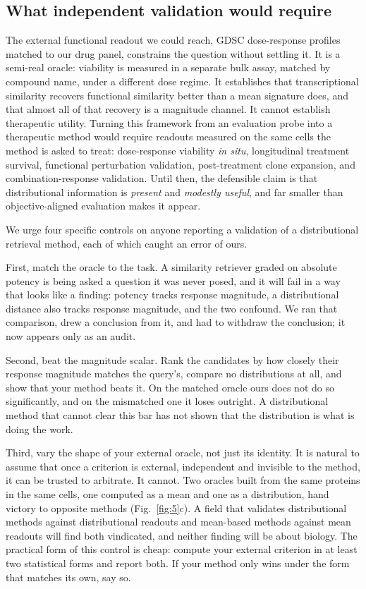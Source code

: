 \documentclass[11pt,letterpaper]{article}
\begin{document}
\subsection*{What independent validation would require}

The external functional readout we could reach, GDSC dose-response profiles matched to our drug
panel, constrains the question without settling it. It is a semi-real oracle: viability is
measured in a separate bulk assay, matched by compound name, under a different dose regime. It
establishes that transcriptional similarity recovers functional similarity better than a mean
signature does, and that almost all of that recovery is a magnitude channel. It cannot establish
therapeutic utility. Turning this framework from an evaluation probe into a therapeutic method would require
readouts measured on the same cells the method is asked to treat: dose-response viability
\emph{in situ}, longitudinal treatment survival, functional perturbation validation,
post-treatment clone expansion, and combination-response validation. Until then, the defensible
claim is that distributional information is \textit{present} and \textit{modestly useful}, and far
smaller than objective-aligned evaluation makes it appear.

We urge four specific controls on anyone reporting a validation of a distributional retrieval
method, each of which caught an error of ours.

First, match the oracle to the task. A similarity retriever graded on absolute potency is
being asked a question it was never posed, and it will fail in a way that looks like a finding:
potency tracks response magnitude, a distributional distance also tracks response magnitude, and
the two confound. We ran that comparison, drew a conclusion from it, and had to withdraw the
conclusion; it now appears only as an audit.

Second, beat the magnitude scalar. Rank the candidates by how closely their response
magnitude matches the query's, compare no distributions at all, and show that your method beats it.
On the matched oracle ours does not do so significantly, and on the mismatched one it loses
outright. A distributional method that cannot clear this bar has not shown that the distribution is
what is doing the work.

Third, vary the shape of your external oracle, not just its identity. It is natural to
assume that once a criterion is external, independent and invisible to the method, it can be
trusted to arbitrate. It cannot. Two oracles built from the same proteins in the same cells, one
computed as a mean and one as a distribution, hand victory to opposite methods (Fig.~\ref{fig:5}c).
A field that validates distributional methods against distributional readouts and mean-based methods
against mean readouts will find both vindicated, and neither finding will be about biology. The
practical form of this control is cheap: compute your external criterion in at least two statistical
forms and report both. If your method only wins under the form that matches its own, say so.
\end{document}
